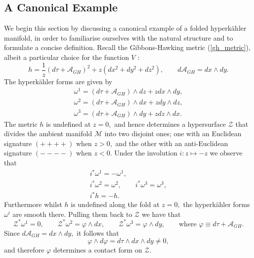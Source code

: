 \documentclass[a4paper,12pt, onecolumn, notitlepage]{article}
\theoremstyle{definition}
\theoremstyle{remark}
\newcommand{\w}{\omega}
\newcommand{\HK}{hyperk\"ahler }
\newcommand{\vp}{\varphi}
\begin{document}
\subsection{A Canonical Example}
We begin this section by discussing a canonical example of a folded \HK manifold, in order to familiarise ourselves with the natural structure and to formulate a concise definition. Recall the Gibbons-Hawking metric (\ref{gh_metric}), albeit a particular choice for the function $V$ \cite{hitchin_2015}:
\begin{equation}
	h = \frac{1}{z}(d\tau + \mathcal{A}_{GH})^{2} + z(dx^{2} + dy^{2} + dz^{2}), \qquad d\mathcal{A}_{GH} = dx\wedge dy.
\end{equation} 
The \HK forms are given by
\begin{subequations}
	\begin{align}
	\w^{1} = (d\tau+\mathcal{A}_{GH})\wedge dz + z dx\wedge dy,\\
	\w^{2} = (d\tau+\mathcal{A}_{GH})\wedge dx + z dy\wedge dz,\\
	\w^{3} = (d\tau+\mathcal{A}_{GH})\wedge dy + z dz\wedge dx.
	\end{align}
\end{subequations}
The metric $h$ is undefined at $z=0,$ and hence determines a hypersurface $\mathcal{Z}$ that divides the ambient manifold $\mathcal{M}$ into two disjoint ones; one with an Euclidean signature $(++++)$ when $z>0,$ and the other with an anti-Euclidean signature $(----)$ when $z<0.$ Under the involution $i:z\mapsto-z$ we observe that
\begin{subequations}
	\begin{gather}
	\label{hk_involution}
	i^{\ast}\w^{1} = -\w^{1},\\
	i^{\ast}\w^{2} = \w^{2},\qquad
	i^{\ast}\w^{3} = \w^{3},\\
	i^{\ast}h = -h.
	\end{gather}
\end{subequations}
Furthermore whilst $h$ is undefined along the fold at $z=0,$ the \HK forms $\w^{i}$ are smooth there. Pulling them back to $\mathcal{Z}$ we have that
\begin{equation}
	\label{pullback_GH}
	\mathcal{Z}^{\ast}\w^{1} = 0,\qquad \mathcal{Z}^{\ast}\w^{2} = \vp\wedge dx,\qquad \mathcal{Z}^{\ast}\w^{3} = \vp\wedge dy,\qquad \text{where } \vp\equiv d\tau + \mathcal{A}_{GH}.
\end{equation}
Since $d\mathcal{A}_{GH} = dx\wedge dy,$ it follows that
\begin{equation}
	\label{contact}
	\vp\wedge d\vp = d\tau\wedge dx \wedge dy \neq 0,
\end{equation}
	and therefore $\vp$ determines a contact form on  $\mathcal{Z}.$
	
\end{document}
